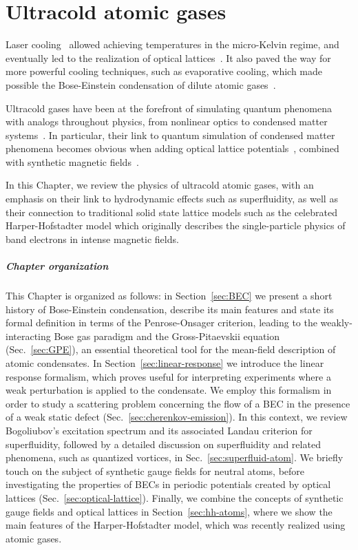 \chapter{Ultracold atomic gases}
\label{cha:cold-gases}

Laser cooling~\cite{RevModPhys.70.685,RevModPhys.70.707} allowed
achieving temperatures in the micro-Kelvin regime, and eventually led
to the realization of optical lattices~\cite{grynberg2001cold}. It
also paved the way for more powerful cooling techniques, such as
evaporative cooling, which made possible the Bose-Einstein
condensation of dilute atomic
gases~\cite{RevModPhys.74.875,RevModPhys.74.1131}.

Ultracold gases have been at the forefront of simulating quantum
phenomena with analogs throughout physics, from nonlinear optics to
condensed matter systems~\cite{RevModPhys.80.885}. In particular,
their link to quantum simulation of condensed matter phenomena becomes
obvious when adding optical lattice
potentials~\cite{RevModPhys.78.179}, combined with synthetic magnetic
fields~\cite{dalibardrmp2011,goldman_repprog_2014}.

In this Chapter, we review the physics of ultracold atomic gases, with
an emphasis on their link to hydrodynamic effects such as
superfluidity, as well as their connection to traditional solid state
lattice models such as the celebrated Harper-Hofstadter model which
originally describes the single-particle physics of band electrons in
intense magnetic fields.

\paragraph{Chapter organization}
This Chapter is organized as follows: in Section~\ref{sec:BEC} we
present a short history of Bose-Einstein condensation, describe its
main features and state its formal definition in terms of the
Penrose-Onsager criterion, leading to the weakly-interacting Bose gas
paradigm and the Gross-Pitaevskii equation (Sec.~\ref{sec:GPE}), an
essential theoretical tool for the mean-field description of atomic
condensates. In Section~\ref{sec:linear-response} we introduce the
linear response formalism, which proves useful for interpreting
experiments where a weak perturbation is applied to the condensate. We
employ this formalism in order to study a scattering problem
concerning the flow of a BEC in the presence of a weak static defect
(Sec.~\ref{sec:cherenkov-emission}). In this context, we review
Bogoliubov's excitation spectrum and its associated Landau criterion
for superfluidity, followed by a detailed discussion on superfluidity
and related phenomena, such as quantized vortices, in
Sec.~\ref{sec:superfluid-atom}. We briefly touch on the subject of
synthetic gauge fields for neutral atoms, before investigating the
properties of BECs in periodic potentials created by optical lattices
(Sec.~\ref{sec:optical-lattice}). Finally, we combine the concepts of
synthetic gauge fields and optical lattices in
Section~\ref{sec:hh-atoms}, where we show the main features of the
Harper-Hofstadter model, which was recently realized using
atomic gases.




